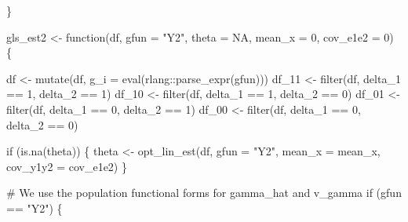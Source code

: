 \documentclass[
  letterpaper,
  DIV=11,
  numbers=noendperiod]{scrartcl}
\newenvironment{Shaded}{\begin{snugshade}}{\end{snugshade}}
\newcommand{\AttributeTok}[1]{\textcolor[rgb]{0.40,0.45,0.13}{#1}}
\newcommand{\CommentTok}[1]{\textcolor[rgb]{0.37,0.37,0.37}{#1}}
\newcommand{\ConstantTok}[1]{\textcolor[rgb]{0.56,0.35,0.01}{#1}}
\newcommand{\ControlFlowTok}[1]{\textcolor[rgb]{0.00,0.23,0.31}{#1}}
\newcommand{\DecValTok}[1]{\textcolor[rgb]{0.68,0.00,0.00}{#1}}
\newcommand{\FunctionTok}[1]{\textcolor[rgb]{0.28,0.35,0.67}{#1}}
\newcommand{\NormalTok}[1]{\textcolor[rgb]{0.00,0.23,0.31}{#1}}
\newcommand{\OtherTok}[1]{\textcolor[rgb]{0.00,0.23,0.31}{#1}}
\newcommand{\SpecialCharTok}[1]{\textcolor[rgb]{0.37,0.37,0.37}{#1}}
\newcommand{\StringTok}[1]{\textcolor[rgb]{0.13,0.47,0.30}{#1}}
\begin{document}
\begin{Shaded}
\begin{Highlighting}[]
\NormalTok{\}}

\NormalTok{gls\_est2 }\OtherTok{\textless{}{-}} \ControlFlowTok{function}\NormalTok{(df, }\AttributeTok{gfun =} \StringTok{"Y2"}\NormalTok{, }\AttributeTok{theta =} \ConstantTok{NA}\NormalTok{, }\AttributeTok{mean\_x =} \DecValTok{0}\NormalTok{, }\AttributeTok{cov\_e1e2 =} \DecValTok{0}\NormalTok{) \{}

\NormalTok{  df }\OtherTok{\textless{}{-}} \FunctionTok{mutate}\NormalTok{(df, }\AttributeTok{g\_i =} \FunctionTok{eval}\NormalTok{(rlang}\SpecialCharTok{::}\FunctionTok{parse\_expr}\NormalTok{(gfun)))}
\NormalTok{  df\_11 }\OtherTok{\textless{}{-}} \FunctionTok{filter}\NormalTok{(df, delta\_1 }\SpecialCharTok{==} \DecValTok{1}\NormalTok{, delta\_2 }\SpecialCharTok{==} \DecValTok{1}\NormalTok{)}
\NormalTok{  df\_10 }\OtherTok{\textless{}{-}} \FunctionTok{filter}\NormalTok{(df, delta\_1 }\SpecialCharTok{==} \DecValTok{1}\NormalTok{, delta\_2 }\SpecialCharTok{==} \DecValTok{0}\NormalTok{)}
\NormalTok{  df\_01 }\OtherTok{\textless{}{-}} \FunctionTok{filter}\NormalTok{(df, delta\_1 }\SpecialCharTok{==} \DecValTok{0}\NormalTok{, delta\_2 }\SpecialCharTok{==} \DecValTok{1}\NormalTok{)}
\NormalTok{  df\_00 }\OtherTok{\textless{}{-}} \FunctionTok{filter}\NormalTok{(df, delta\_1 }\SpecialCharTok{==} \DecValTok{0}\NormalTok{, delta\_2 }\SpecialCharTok{==} \DecValTok{0}\NormalTok{)}

  \ControlFlowTok{if}\NormalTok{ (}\FunctionTok{is.na}\NormalTok{(theta)) \{}
\NormalTok{    theta }\OtherTok{\textless{}{-}} \FunctionTok{opt\_lin\_est}\NormalTok{(df, }\AttributeTok{gfun =} \StringTok{"Y2"}\NormalTok{, }\AttributeTok{mean\_x =}\NormalTok{ mean\_x, }\AttributeTok{cov\_y1y2 =}\NormalTok{ cov\_e1e2)}
\NormalTok{  \}}

  \CommentTok{\# We use the population functional forms for gamma\_hat and v\_gamma}
  \ControlFlowTok{if}\NormalTok{ (gfun }\SpecialCharTok{==} \StringTok{"Y2"}\NormalTok{) \{}


\end{Highlighting}
\end{Shaded}
\end{document}
